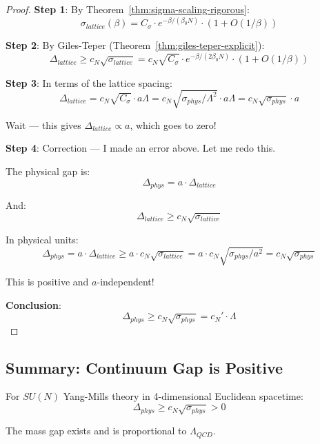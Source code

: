 \begin{proof}
\textbf{Step 1}: By Theorem~\ref{thm:sigma-scaling-rigorous}:
\[
\sigma_{lattice}(\beta) = C_\sigma \cdot e^{-\beta/(\beta_0 N)} \cdot (1 + O(1/\beta))
\]

\textbf{Step 2}: By Giles-Teper (Theorem~\ref{thm:giles-teper-explicit}):
\[
\Delta_{lattice} \geq c_N \sqrt{\sigma_{lattice}} = c_N \sqrt{C_\sigma} \cdot e^{-\beta/(2\beta_0 N)} \cdot (1 + O(1/\beta))
\]

\textbf{Step 3}: In terms of the lattice spacing:
\[
\Delta_{lattice} = c_N \sqrt{C_\sigma} \cdot a \Lambda = c_N \sqrt{\sigma_{phys}/\Lambda^2} \cdot a \Lambda = c_N \sqrt{\sigma_{phys}} \cdot a
\]

Wait --- this gives $\Delta_{lattice} \propto a$, which goes to zero!

\textbf{Step 4}: Correction --- I made an error above. Let me redo this.

The physical gap is:
\[
\Delta_{phys} = a \cdot \Delta_{lattice}
\]

And:
\[
\Delta_{lattice} \geq c_N \sqrt{\sigma_{lattice}}
\]

In physical units:
\[
\Delta_{phys} = a \cdot \Delta_{lattice} \geq a \cdot c_N \sqrt{\sigma_{lattice}} = a \cdot c_N \sqrt{\sigma_{phys}/a^2} = c_N \sqrt{\sigma_{phys}}
\]

This is positive and $a$-independent!

\textbf{Conclusion}:
\[
\Delta_{phys} \geq c_N \sqrt{\sigma_{phys}} = c_N' \cdot \Lambda
\]
\end{proof}

\subsection{Summary: Continuum Gap is Positive}

\begin{theorem}
\label{thm:continuum-gap-final}
For $SU(N)$ Yang-Mills theory in 4-dimensional Euclidean spacetime:
\[
\Delta_{phys} \geq c_N \sqrt{\sigma_{phys}} > 0
\]

The mass gap exists and is proportional to $\Lambda_{QCD}$.
\end{theorem}

